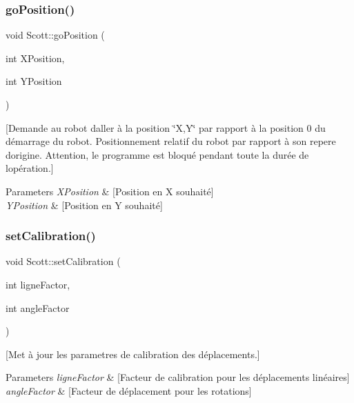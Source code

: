 \subsubsection{\texorpdfstring{go\+Position()}{goPosition()}}
{\footnotesize\ttfamily void Scott\+::go\+Position (\begin{DoxyParamCaption}\item[{int}]{X\+Position,  }\item[{int}]{Y\+Position }\end{DoxyParamCaption})}

\mbox{[}Demande au robot d\textquotesingle{}aller à la position \char`\"{}\+X,\+Y\char`\"{} par rapport à la position 0 du démarrage du robot. Positionnement relatif du robot par rapport à son repere d\textquotesingle{}origine. Attention, le programme est bloqué pendant toute la durée de l\textquotesingle{}opération.\mbox{]} 
\begin{DoxyParams}{Parameters}
{\em X\+Position} & \mbox{[}Position en X souhaité\mbox{]} \\
\hline
{\em Y\+Position} & \mbox{[}Position en Y souhaité\mbox{]} \\
\hline
\end{DoxyParams}
\hypertarget{class_scott_a01aa6dd0028cad19003380dd8915fb01}{}\label{class_scott_a01aa6dd0028cad19003380dd8915fb01} 
\subsubsection{\texorpdfstring{set\+Calibration()}{setCalibration()}}
{\footnotesize\ttfamily void Scott\+::set\+Calibration (\begin{DoxyParamCaption}\item[{int}]{ligne\+Factor,  }\item[{int}]{angle\+Factor }\end{DoxyParamCaption})}

\mbox{[}Met à jour les parametres de calibration des déplacements.\mbox{]} 
\begin{DoxyParams}{Parameters}
{\em ligne\+Factor} & \mbox{[}Facteur de calibration pour les déplacements linéaires\mbox{]} \\
\hline
{\em angle\+Factor} & \mbox{[}Facteur de déplacement pour les rotations\mbox{]} \\
\hline
\end{DoxyParams}
\hypertarget{class_scott_a03810d284564569d63f6afd3548f1504}{}\label{class_scott_a03810d284564569d63f6afd3548f1504} 
